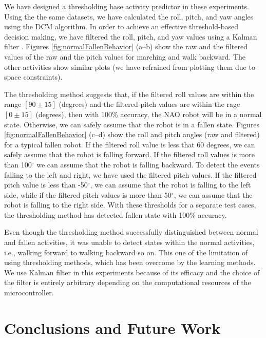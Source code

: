 \documentclass[letterpaper]{article}
\begin{document}
\begin{sloppy}
We have designed a thresholding base activity predictor in these experiments. Using the the same 
datasets, we have calculated the roll, pitch, and yaw angles  using the DCM algorithm. In order to 
achieve an effective threshold-based decision making, we have filtered the roll, pitch, and
yaw values using a Kalman filter \cite{Welch:1995:IKF:897831}. Figures 
\ref{fig:normalFallenBehavior} (a--b) show the raw and the filtered values of the raw and the 
pitch values for marching and walk backward. The other activities show similar plots (we have 
refrained from plotting them due to space constraints). 

The thresholding method suggests that, if the filtered roll values are within the range $[90\pm15]$ 
(degrees) and the filtered pitch values are within the rage $[0\pm15]$ (degrees), then with 100\% 
accuracy, the NAO  robot will be in a normal state. Otherwise, we can safely assume that the robot 
is in a fallen state. Figures \ref{fig:normalFallenBehavior} (c--d) show the roll and pitch 
angles (raw and filtered) for a typical fallen robot. If the filtered roll value is less that 60 
degrees, we can safely assume that the robot is falling forward. If the filtered roll values is 
more than 100$^{\circ}$ we can assume that the robot is falling backward. To detect the events 
falling to the left and right, we have used the filtered pitch values. If the filtered pitch value 
is less than -50$^{\circ}$, we can assume that the robot is falling to the left side, while if the 
filtered pitch values is more than 50$^{\circ}$, we can assume that the robot is falling to the right 
side. With these thresholds for a separate test cases, the thresholding method has detected fallen 
state with 100\% accuracy. 

Even though the thresholding method successfully distinguished between normal and fallen 
activities, it was unable to detect states within the normal activities, i.e., walking forward 
to walking backward so on. This one of the limitation of using thresholding methods, which has 
been overcome by the learning methods.  We use Kalman filter in this experiments because of its 
efficacy and the choice of the filter is entirely arbitrary depending on the computational 
resources of the microcontroller.  


\section{Conclusions and Future Work}


\end{sloppy}
\end{document}
